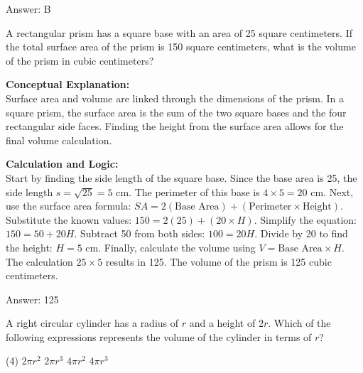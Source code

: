 \documentclass[11pt,paper=a4,answers]{exam}
\begin{document}
\begin{questions}
\begin{solution}
\vspace{30pt}

Answer: \colorbox{yellow!100}{B}
\end{solution}

\vspace{60pt}

\question
A rectangular prism has a square base with an area of 25 square centimeters. If the total surface area of the prism is 150 square centimeters, what is the volume of the prism in cubic centimeters?

\begin{solution}
\textbf{Conceptual Explanation:} \\
Surface area and volume are linked through the dimensions of the prism. In a square prism, the surface area is the sum of the two square bases and the four rectangular side faces. Finding the height from the surface area allows for the final volume calculation.

\vspace{30pt}

\textbf{Calculation and Logic:} \\
Start by finding the side length of the square base. Since the base area is 25, the side length $s = \sqrt{25} = 5$ cm. The perimeter of this base is $4 \times 5 = 20$ cm. Next, use the surface area formula: $SA = 2(\text{Base Area}) + (\text{Perimeter} \times \text{Height})$. Substitute the known values: $150 = 2(25) + (20 \times H)$. Simplify the equation: $150 = 50 + 20H$. Subtract 50 from both sides: $100 = 20H$. Divide by 20 to find the height: $H = 5$ cm. Finally, calculate the volume using $V = \text{Base Area} \times H$. The calculation $25 \times 5$ results in 125. The volume of the prism is 125 cubic centimeters.

\vspace{30pt}

Answer: \colorbox{yellow!100}{125}
\end{solution}

\vspace{60pt}

\question
A right circular cylinder has a radius of $r$ and a height of $2r$. Which of the following expressions represents the volume of the cylinder in terms of $r$?
\begin{tasks}(4)
    \task $2\pi r^2$
    \task $2\pi r^3$
    \task $4\pi r^2$
    \task $4\pi r^3$
\end{tasks}


\end{questions}
\end{document}
